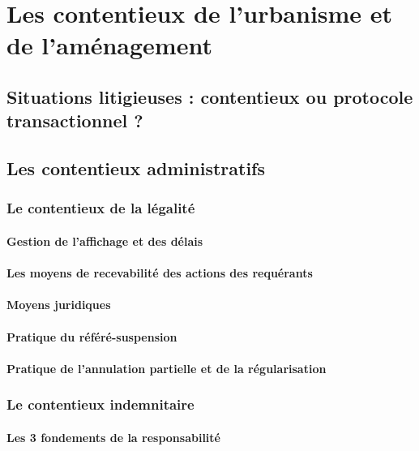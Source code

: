 \chapter[Contentieux]{Les contentieux de l'urbanisme et de l'aménagement}

\section{Situations litigieuses : contentieux ou protocole transactionnel ?}

\section{Les contentieux administratifs}

	\subsection{Le contentieux de la légalité}
		
		\subsubsection{Gestion de l'affichage et des délais}
		
		\subsubsection{Les moyens de recevabilité des actions des requérants}
		
		\subsubsection{Moyens juridiques}
		
		\subsubsection{Pratique du référé-suspension}
		
		\subsubsection{Pratique de l'annulation partielle et de la régularisation}
		
	\subsection{Le contentieux indemnitaire}
	
		\subsubsection{Les 3 fondements de la responsabilité}
		

